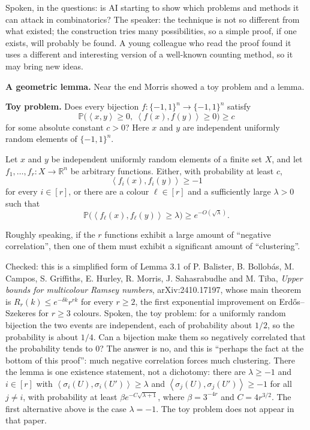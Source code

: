 \noindent
Spoken, in the questions: is AI starting to
show which problems and methods it can
attack in combinatorics? The speaker: the
technique is not so different from what
existed; the construction tries many
possibilities, so a simple proof, if one
exists, will probably be found. A young
colleague who read the proof found it uses
a different and interesting version of a
well-known counting method, so it may bring
new ideas.

\medskip\noindent
{\bf A geometric lemma.} Near the end Morris
showed a toy problem and a lemma.

\medskip\noindent
{\bf Toy problem.} Does every bijection
$f : \{-1,1\}^n \to \{-1,1\}^n$ satisfy
$$
\mathbb{P}\big(\left\langle{} x,y
\right\rangle{} \ge 0, \
\left\langle{} f(x),f(y) \right\rangle{}
\ge 0\big) \ge c
$$
for some absolute constant $c > 0$? Here $x$
and $y$ are independent uniformly random
elements of $\{-1,1\}^n$.

\begin{lemma}
\label{lemma-geometric}
Let $x$ and $y$ be independent uniformly
random elements of a finite set $X$, and let
$f_1, \ldots, f_r : X \to \mathbb{R}^n$ be
arbitrary functions. Either, with
probability at least $c$,
$$
\left\langle{} f_i(x),f_i(y)
\right\rangle{} \ge -1
$$
for every $i \in [r]$, or there are a colour
$\ell \in [r]$ and a
sufficiently large $\lambda > 0$ such that
$$
\mathbb{P}\big(\left\langle{} f_\ell(x),
f_\ell(y) \right\rangle{} \ge \lambda\big)
\ge e^{-O(\sqrt{\lambda})}.
$$
\end{lemma}

\noindent
Roughly speaking, if the $r$ functions
exhibit a large amount of ``negative
correlation'', then one of them must exhibit
a significant amount of ``clustering''.

\begin{remark}
\label{remark-geometric-lemma-source}
Checked: this is a simplified form of
Lemma 3.1 of P. Balister, B. Bollob\'as,
M. Campos, S. Griffiths, E. Hurley,
R. Morris, J. Sahasrabudhe and M. Tiba,
\emph{Upper bounds for multicolour Ramsey
numbers}, arXiv:2410.17197, whose main
theorem is
$R_r(k) \le e^{-\delta k} r^{rk}$ for every
$r \ge 2$, the first exponential improvement
on Erd\H{o}s--Szekeres for $r \ge 3$ colours.
Spoken, the toy problem: for a uniformly
random bijection the two events are
independent, each of probability about
$1/2$, so the probability is about $1/4$.
Can a bijection make them so negatively
correlated that the probability tends to
$0$? The answer is no, and this is
``perhaps the fact at the bottom of this
proof'': much negative correlation forces
much clustering.
There the lemma is one existence statement,
not a dichotomy: there are $\lambda \ge -1$
and $i \in [r]$ with
$\left\langle{} \sigma_i(U), \sigma_i(U')
\right\rangle{} \ge \lambda$ and
$\left\langle{} \sigma_j(U), \sigma_j(U')
\right\rangle{} \ge -1$ for all $j \ne i$,
with probability
at least $\beta e^{-C\sqrt{\lambda+1}}$,
where $\beta = 3^{-4r}$ and
$C = 4r^{3/2}$. The first alternative above
is the case $\lambda = -1$. The toy problem
does not appear in that paper.
\end{remark}

